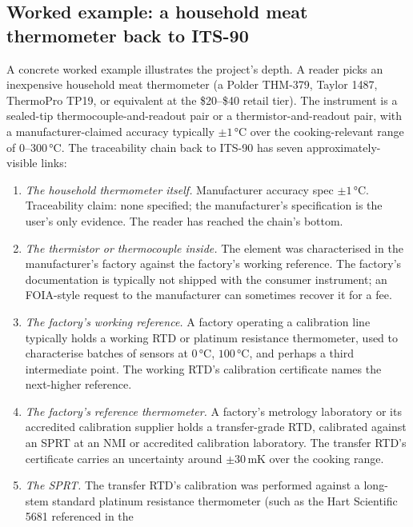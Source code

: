 \subsection*{Worked example: a household meat thermometer back to
ITS-90}

A concrete worked example illustrates the project's depth. A
reader picks an inexpensive household meat thermometer (a Polder
THM-379, Taylor 1487, ThermoPro TP19, or equivalent at the
\$20--\$40 retail tier). The instrument is a sealed-tip
thermocouple-and-readout pair or a thermistor-and-readout pair,
with a manufacturer-claimed accuracy typically $\pm 1 \,\si{
\degreeCelsius}$ over the cooking-relevant range of
$0$--$300 \,\si{\degreeCelsius}$. The traceability chain back to
ITS-90 has seven approximately-visible links:

\begin{enumerate}[leftmargin=*]
  \item \emph{The household thermometer itself.} Manufacturer
    accuracy spec $\pm 1 \,\si{\degreeCelsius}$. Traceability claim:
    none specified; the manufacturer's specification is the user's
    only evidence. The reader has reached the chain's bottom.
  \item \emph{The thermistor or thermocouple inside.} The element
    was characterised in the manufacturer's factory against the
    factory's working reference. The factory's documentation is
    typically not shipped with the consumer instrument; an FOIA-style
    request to the manufacturer can sometimes recover it for a
    fee.
  \item \emph{The factory's working reference.} A factory operating
    a calibration line typically holds a working RTD or platinum
    resistance thermometer, used to characterise batches of
    sensors at $0 \,\si{\degreeCelsius}$, $100 \,\si{\degreeCelsius}$,
    and perhaps a third intermediate point. The working RTD's
    calibration certificate names the next-higher reference.
  \item \emph{The factory's reference thermometer.} A factory's
    metrology laboratory or its accredited calibration supplier
    holds a transfer-grade RTD, calibrated against an SPRT at an
    NMI or accredited calibration laboratory. The transfer RTD's
    certificate carries an uncertainty around $\pm 30 \,\si{
    \milli\kelvin}$ over the cooking range.
  \item \emph{The SPRT.} The transfer RTD's calibration was
    performed against a long-stem standard platinum resistance
    thermometer (such as the Hart Scientific 5681 referenced in the

\end{enumerate}
